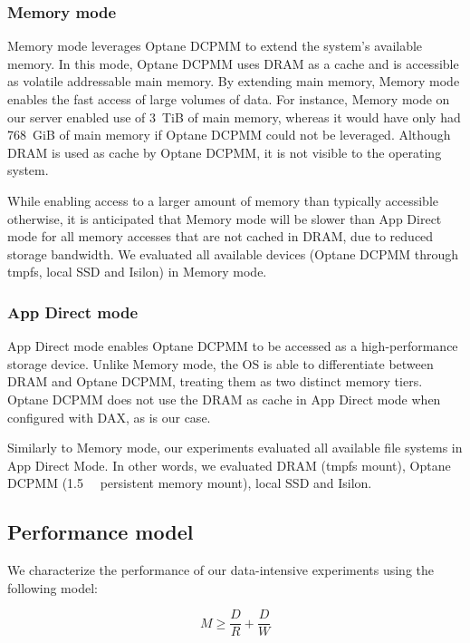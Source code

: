 \subsubsection{Memory mode}

Memory mode leverages Optane DCPMM to extend the system's available memory. In
this mode, Optane DCPMM uses DRAM as a cache and is accessible as volatile
addressable main memory. By extending main memory, Memory mode enables the fast
access of large volumes of data. For instance, Memory mode on our server enabled
use of 3~TiB of main memory, whereas it would have only had 768~GiB of main
memory if Optane DCPMM could not be leveraged. Although DRAM is used as cache by
Optane DCPMM, it is not visible to the operating system. 

While enabling access to a larger amount of memory than typically accessible
otherwise, it is anticipated that Memory mode will be slower than App Direct
mode for all memory accesses that are not cached in DRAM, due to reduced storage
bandwidth. We evaluated all available devices (Optane DCPMM through tmpfs, local
SSD and Isilon) in Memory mode.

\subsubsection{App Direct mode}

App Direct mode enables Optane DCPMM to be accessed as a high-performance
storage device. Unlike Memory mode, the OS is able to differentiate between DRAM
and Optane DCPMM, treating them as two distinct memory tiers. Optane DCPMM does
not use the DRAM as cache in App Direct mode when configured with DAX, as is our
case.

Similarly to Memory mode, our experiments evaluated all available file systems
in App Direct Mode. In other words, we evaluated DRAM (tmpfs mount), Optane
DCPMM (\SI{1.5}{\tebi\byte} persistent memory mount), local SSD and Isilon.


\subsection{Performance model}

We characterize the performance of our data-intensive experiments using the
following model:

\begin{equation}
    M \geq \frac{D}{R} + \frac{D}{W} \label{eq:optane:makespan}
\end{equation}

